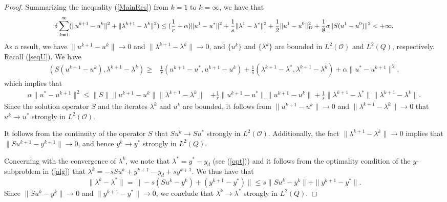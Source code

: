 \documentclass[final]{siamart171218}
\theoremstyle{remark}
\begin{document}
\begin{proof}
	Summarizing the inequality (\ref{MainRes}) from $k = 1$ to $k = \infty$, we have that
	\begin{equation*}
		{\small
	\begin{aligned}
	\delta \sum_{k= 1}^{\infty} (\|u^{k+1} - u^k \|^2 + \|\lambda^{k+1} - \lambda^k \|^2)  \leq  (\frac{1}{r} + \alpha )\|u^{1}- u^*\|^2  + \frac{1}{s}\|\lambda^{1}- \lambda^*\|^2 + \frac{1}{2} \|u^{1} - u^{0}\|^2_D + \frac{1}{8}  \sigma  \|S(u^{1} - u^{0})\|^2
	<  + \infty.
	\end{aligned}}
	\end{equation*}
	As a result, we have $\|u^{k+1} - u^k\|\rightarrow 0$ and $\|\lambda^{k+1} - \lambda^k\| \rightarrow 0$, and $\{u^k\}$ and $\{\lambda^k\}$ are bounded in $L^2(\mathcal{O})$ and $L^2(Q)$, respectively. Recall (\ref{seqU}). We have
		$$
		\begin{aligned}
		(S (u^{k+1}- u^k), \lambda^{k+1}-\lambda^k ) \geq& \frac{1}{r}( u^{k+1} - u^*, u^{k +1} - u^k) + \frac{1}{s}( \lambda^{k+1} - \lambda^*,\lambda^{k+1} - \lambda^k) + \alpha \| u^* -  u^{k+1} \|^2,
		\end{aligned}
		$$
	    which implies that
		\begin{equation*}
		\begin{aligned}
		\alpha \| u^* -  u^{k+1} \|^2 \leq  \|S\| \|u^{k+1}- u^k\|\| \lambda^{k+1}-\lambda^k \| &+ \frac{1}{r} \|u^{k+1} - u^*\|\| u^{k +1} - u^k \|+ \frac{1}{s}\| \lambda^{k+1} - \lambda^*\|\|\lambda^{k+1} - \lambda^k\|    .
	    \end{aligned}
		\end{equation*}
		Since the solution operator $S$ and the iterates $\lambda^k$ and $u^k$ are bounded, it follows from $\|u^{k+1} - u^k\|\rightarrow 0$ and $\|\lambda^{k+1} - \lambda^k\| \rightarrow 0$ that
		$u^{k} \rightarrow u^*$ strongly in $L^2(\mathcal{O}).$
		
		It follows from the continuity of the operator $S$ that $Su^{k} \rightarrow Su^*$ strongly in $L^2(\mathcal{O})$.
		Additionally, the fact $\|\lambda^{k+1} - \lambda^k\| \rightarrow 0$  implies that $\|Su^{k+1}-y^{k+1}\|\rightarrow 0$, and hence
		$y^k\rightarrow y^*$ strongly in  $L^2(Q).$
		
		Concerning with the convergence of $\lambda^k$, we note that $\lambda^*=y^*-y_d$ (see (\ref{opt})) and it follows from the optimality condition of the $y$-subproblem in (\ref{alg}) that
		$
		\lambda^k=-sSu^k+y^{k+1}-y_d+sy^{k+1}.
		$
		We thus have that
		$$
		\|\lambda^k-\lambda^*\|=\|-s(Su^k-y^k)+(y^{k+1}-y^*)\|\leq s\|Su^k-y^k\|+\|y^{k+1}-y^*\|.
		$$
		Since $\|Su^{k}-y^{k}\|\rightarrow 0$ and $\|y^{k+1}-y^*\|\rightarrow 0$, we conclude that
		$\lambda^k\rightarrow \lambda^*$ strongly in $L^2(Q)$.
\end{proof}
\end{document}
